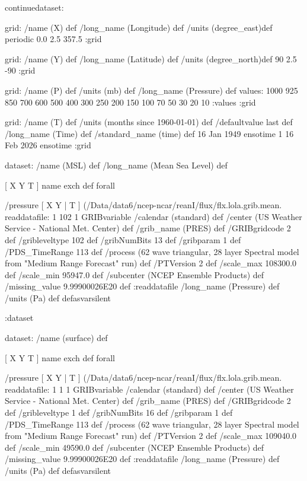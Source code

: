 \begin{ingrid}

continuedataset:

grid:
/name (X) def
/long_name (Longitude) def
/units (degree_east)def
periodic
 0.0 2.5 357.5
:grid

grid:
/name (Y) def
/long_name (Latitude) def
/units (degree_north)def
90 2.5 -90
:grid

grid:
/name (P) def
/units (mb) def
/long_name (Pressure) def
values: 1000 925 850 700 600 500 400 300 250 200 150 100 70 50 30 20 10 :values
:grid

grid:
/name (T) def
/units (months since 1960-01-01) def
/defaultvalue { last } def
/long_name (Time) def
/standard_name (time) def
16 Jan 1949 ensotime
1
16 Feb 2026 ensotime 
:grid


 dataset: /name (MSL) def /long_name (Mean Sea Level) def

 [ X Y T ] { name exch def } forall

  /pressure { [ X Y | T ] (/Data/data6/ncep-ncar/reanI/flux/flx.lola.grib.mean.%
  readdatafile:
  1 102 1 GRIBvariable
  /calendar (standard) def
  /center (US Weather Service - National Met. Center) def
  /grib_name (PRES) def
  /GRIBgridcode 2 def
  /gribleveltype 102 def
  /gribNumBits 13 def
  /gribparam 1 def
  /PDS_TimeRange 113 def
  /process (62 wave triangular, 28 layer Spectral model from "Medium Range Forecast" run) def
  /PTVersion 2 def
  /scale_max 108300.0 def
  /scale_min 95947.0 def
  /subcenter (NCEP Ensemble Products) def
  /missing_value 9.99900026E20 def
  :readdatafile
  /long_name (Pressure) def
  /units (Pa) def
  } defasvarsilent

 :dataset

 dataset: /name (surface) def
  
 [ X Y T ] { name exch def } forall

  /pressure { [ X Y | T ] (/Data/data6/ncep-ncar/reanI/flux/flx.lola.grib.mean.%
  readdatafile:
  1 1 1 GRIBvariable
  /calendar (standard) def
  /center (US Weather Service - National Met. Center) def
  /grib_name (PRES) def
  /GRIBgridcode 2 def
  /gribleveltype 1 def
  /gribNumBits 16 def
  /gribparam 1 def
  /PDS_TimeRange 113 def
  /process (62 wave triangular, 28 layer Spectral model from "Medium Range Forecast" run) def
  /PTVersion 2 def
  /scale_max 109040.0 def
  /scale_min 49590.0 def
  /subcenter (NCEP Ensemble Products) def
  /missing_value 9.99900026E20 def
  :readdatafile
  /long_name (Pressure) def
  /units (Pa) def
  } defasvarsilent 


\end{ingrid}
